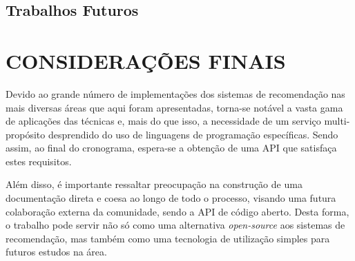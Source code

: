 \documentclass[12pt, openright, oneside, a4paper, brazil]{abntex2}
\begin{document}
\section{Trabalhos Futuros} \label{trabalhos_futuros}

\chapter{CONSIDERAÇÕES FINAIS}

Devido ao grande número de implementações dos sistemas de recomendação nas mais diversas áreas que aqui foram apresentadas, torna-se notável a vasta gama de aplicações das técnicas e, mais do que isso, a necessidade de um serviço multi-propósito desprendido do uso de linguagens de programação específicas. Sendo assim, ao final do cronograma, espera-se a obtenção de uma API que satisfaça estes requisitos.

Além disso, é importante ressaltar preocupação na construção de uma documentação direta e coesa ao longo de todo o processo, visando uma futura colaboração externa da comunidade, sendo a API de código aberto. Desta forma, o trabalho pode servir não só como uma alternativa \textit{open-source} aos sistemas de recomendação, mas também como uma tecnologia de utilização simples para futuros estudos na área.

\postextual

\end{document}
